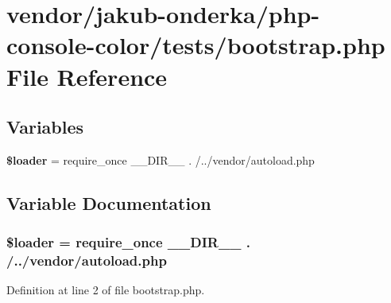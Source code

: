 \section{vendor/jakub-\/onderka/php-\/console-\/color/tests/bootstrap.php File Reference}
\label{jakub-onderka_2php-console-color_2tests_2bootstrap_8php}
\subsection*{Variables}
\begin{DoxyCompactItemize}
\item 
{\bf \$loader} = require\+\_\+once \+\_\+\+\_\+\+D\+I\+R\+\_\+\+\_\+ . \textquotesingle{}/../vendor/autoload.\+php\textquotesingle{}
\end{DoxyCompactItemize}


\subsection{Variable Documentation}
\subsubsection[{\$loader}]{\setlength{\rightskip}{0pt plus 5cm}\$loader = require\+\_\+once \+\_\+\+\_\+\+D\+I\+R\+\_\+\+\_\+ . \textquotesingle{}/../vendor/autoload.\+php\textquotesingle{}}\label{jakub-onderka_2php-console-color_2tests_2bootstrap_8php_ab832f4c463ee1c9ba2e9464265f7ea3b}


Definition at line 2 of file bootstrap.\+php.

